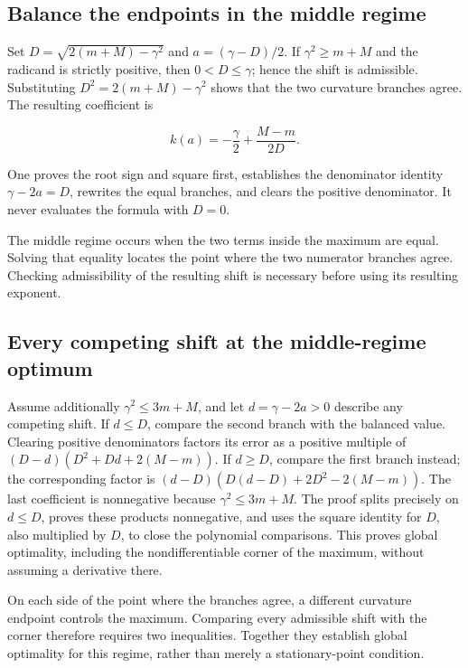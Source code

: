 \documentclass[11pt,a4paper]{report}
\begin{document}
\subsection{\texorpdfstring{Balance the endpoints in the middle regime}{Balance the endpoints in the middle regime}}
\label{report-step-KineticLangevin-Friction-lean-3}


Set \(D=\sqrt{2(m+M)-\gamma^2}\) and \(a=(\gamma-D)/2\). If \(\gamma^2\ge m+M\) and the radicand is strictly positive, then \(0<D\le\gamma\); hence the shift is admissible. Substituting \(D^2=2(m+M)-\gamma^2\) shows that the two curvature branches agree. The resulting coefficient is

\[k(a)=-\frac\gamma2+\frac{M-m}{2D}.\]

One proves the root sign and square first, establishes the denominator identity \(\gamma-2a=D\), rewrites the equal branches, and clears the positive denominator. It never evaluates the formula with \(D=0\).



The middle regime occurs when the two terms inside the maximum are equal. Solving that equality locates the point where the two numerator branches agree. Checking admissibility of the resulting shift is necessary before using its resulting exponent.

\subsection{\texorpdfstring{Every competing shift at the middle-regime optimum}{Every competing shift at the middle-regime optimum}}
\label{report-step-KineticLangevin-Friction-lean-4}


Assume additionally \(\gamma^2\le3m+M\), and let \(d=\gamma-2a>0\) describe any competing shift. If \(d\le D\), compare the second branch with the balanced value. Clearing positive denominators factors its error as a positive multiple of \((D-d)(D^2+Dd+2(M-m))\). If \(d\ge D\), compare the first branch instead; the corresponding factor is \((d-D)(D(d-D)+2D^2-2(M-m))\). The last coefficient is nonnegative because \(\gamma^2\le3m+M\). The proof splits precisely on \(d\le D\), proves these products nonnegative, and uses the square identity for \(D\), also multiplied by \(D\), to close the polynomial comparisons. This proves global optimality, including the nondifferentiable corner of the maximum, without assuming a derivative there.



On each side of the point where the branches agree, a different curvature endpoint controls the maximum. Comparing every admissible shift with the corner therefore requires two inequalities. Together they establish global optimality for this regime, rather than merely a stationary-point condition.
\end{document}
